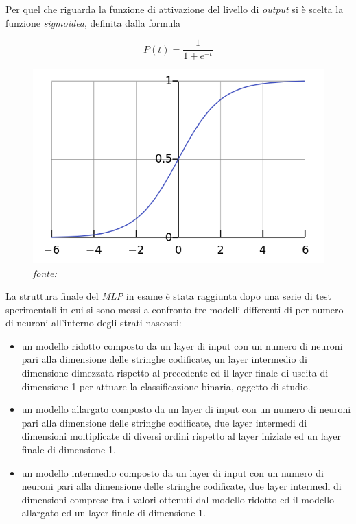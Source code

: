 Per quel che riguarda la funzione di attivazione del livello di \textit{output} si è scelta la funzione \textit{sigmoidea}, definita dalla formula 

\[P(t) = \frac{1}{1+e^{-t}}\]

\begin{figure}[htb]
    \centering
    \includegraphics[width=0.7\columnwidth]{figures/sigmoid.png}
    \caption{\textit{fonte:}~\cite{fig:sigmoid}\label{fig:sigmoid}}
\end{figure}

La struttura finale del \textit{MLP} in esame è stata raggiunta dopo una serie di test sperimentali in cui si sono messi a confronto tre modelli differenti di per numero di neuroni all'interno degli strati nascosti:

\begin{itemize}
\item un modello ridotto composto da un layer di input con un numero di neuroni pari alla dimensione delle stringhe codificate, un layer intermedio di dimensione dimezzata rispetto al precedente ed il layer finale di uscita di dimensione 1 per attuare la classificazione binaria, oggetto di studio.

\item un modello allargato composto da un layer di input con un numero di neuroni pari alla dimensione delle stringhe codificate, due layer intermedi di dimensioni moltiplicate di diversi ordini rispetto al layer iniziale ed un layer finale di dimensione 1.

\item un modello intermedio composto da un layer di input con un numero di neuroni pari alla dimensione delle stringhe codificate, due layer intermedi di dimensioni comprese tra i valori ottenuti dal modello ridotto ed il modello allargato ed un layer finale di dimensione 1. 

\end{itemize}

